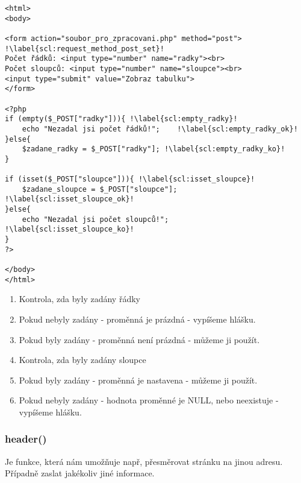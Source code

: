 \begin{minipage}[t]{.45\textwidth}
\begin{code}
\begin{verbatim}
<html>
<body>

<form action="soubor_pro_zpracovani.php" method="post"> !\label{scl:request_method_post_set}!
Počet řádků: <input type="number" name="radky"><br>
Počet sloupců: <input type="number" name="sloupce"><br>
<input type="submit" value="Zobraz tabulku">
</form>

<?php
if (empty($_POST["radky"])){ !\label{scl:empty_radky}!
	echo "Nezadal jsi počet řádků!";	!\label{scl:empty_radky_ok}!
}else{
	$zadane_radky = $_POST["radky"]; !\label{scl:empty_radky_ko}!
}

if (isset($_POST["sloupce"])){ !\label{scl:isset_sloupce}!
	$zadane_sloupce = $_POST["sloupce"]; !\label{scl:isset_sloupce_ok}!
}else{
	echo "Nezadal jsi počet sloupců!";	 !\label{scl:isset_sloupce_ko}!
}
?> 

</body>
</html> 
\end{verbatim}

\label{code:php_empty}
\end{code}
\end{minipage}
\begin{minipage}[t]{.45\textwidth}
\vspace{9cm}
\begin{enumerate}
\item[ř. \ref{scl:empty_radky}:] Kontrola, zda byly zadány řádky
\item[ř. \ref{scl:empty_radky_ok}:] Pokud nebyly zadány - proměnná je prázdná - vypíšeme hlášku.
\item[ř. \ref{scl:empty_radky_ko}:] Pokud byly zadány - proměnná není prázdná - můžeme ji použít.
\item[ř. \ref{scl:isset_sloupce}:] Kontrola, zda byly zadány sloupce
\item[ř. \ref{scl:isset_sloupce_ok}:] Pokud byly zadány - proměnná je nastavena - můžeme ji použít.
\item[ř. \ref{scl:isset_sloupce_ko}:] Pokud nebyly zadány - hodnota proměnné je NULL, nebo neexistuje - vypíšeme hlášku.
\end{enumerate}
\end{minipage}

\subsubsection{header()}
Je funkce, která nám umožňuje např, přesměrovat stránku na jinou adresu.  Případně zaslat jakékoliv jiné  informace.

